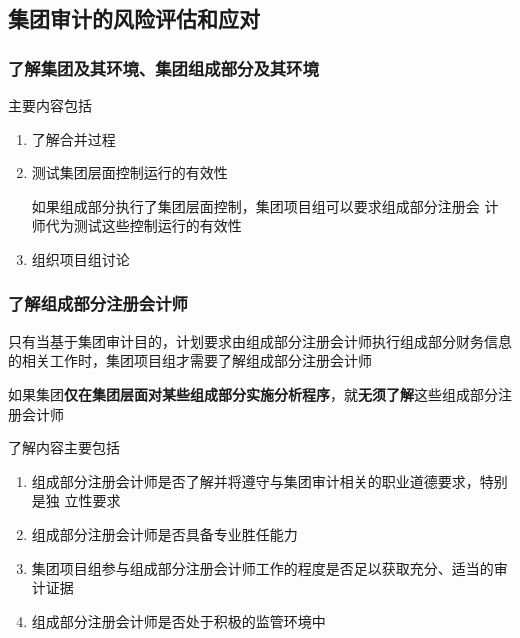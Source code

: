 \documentclass[UTF8,12pt]{ctexart}
\numberwithin{equation}{section} %
\numberwithin{figure}{section}
\numberwithin{table}{section}
\begin{document}
	\subsection{集团审计的风险评估和应对}
	
	\subsubsection{了解集团及其环境、集团组成部分及其环境}
	主要内容包括
	\begin{enumerate}
		\item 了解合并过程
		
		\item 测试集团层面控制运行的有效性
		
		如果组成部分执行了集团层面控制，集团项目组可以要求组成部分注册会 计师代为测试这些控制运行的有效性
		
		\item 组织项目组讨论
	\end{enumerate}
	
	
	\subsubsection{了解组成部分注册会计师}
	只有当基于集团审计目的，计划要求由组成部分注册会计师执行组成部分财务信息 的相关工作时，集团项目组才需要了解组成部分注册会计师 
	
	如果集团\textbf{仅在集团层面对某些组成部分实施分析程序}，就\textbf{无须了解}这些组成部分注 册会计师
	
	了解内容主要包括
	\begin{enumerate}
		\item 组成部分注册会计师是否了解并将遵守与集团审计相关的职业道德要求，特别是独 立性要求
		
		\item 组成部分注册会计师是否具备专业胜任能力 
		
		\item 集团项目组参与组成部分注册会计师工作的程度是否足以获取充分、适当的审计证据 
		
		\item 组成部分注册会计师是否处于积极的监管环境中
	\end{enumerate}
	
\end{document}
